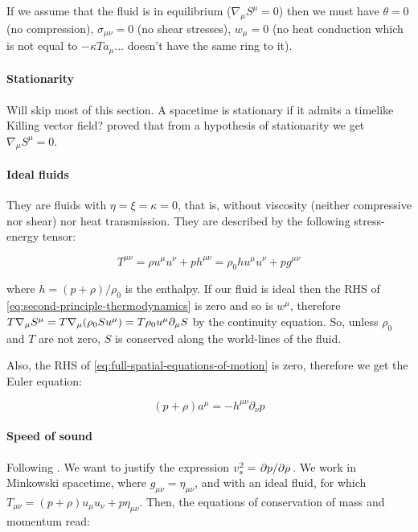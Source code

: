 \documentclass[main.tex]{subfiles}
\begin{document}
If we assume that the fluid is in equilibrium (\(\nabla_\mu S^\mu = 0\)) then we must have \(\theta = 0\) (no compression), \(\sigma_{\mu\nu} = 0 \) (no shear stresses), \(w_\mu=0\) (no heat conduction which is not equal to \(-\kappa T a_\mu\)... doesn't have the same ring to it).

\paragraph{Stationarity}

Will skip most of this section. A spacetime is stationary if it admits a timelike Killing vector field? \textcite[]{Ehlers:1971} proved that from a hypothesis of stationarity we get \(\nabla_\mu S^\mu = 0\).

\paragraph{Ideal fluids}

They are fluids with \(\eta=\xi=\kappa=0\), that is, without viscosity (neither compressive nor shear) nor heat transmission.
They are described by the following stress-energy tensor:

\begin{equation}
    T^{\mu\nu} = \rho u^\mu u^\nu + p h^{\mu\nu} = \rho_0 h u^{\mu} u^\nu + p g^{\mu\nu}
\end{equation}

where \(h = (p + \rho) / \rho_0\) is the enthalpy. If our fluid is ideal then the RHS of \eqref{eq:second-principle-thermodynamics} is zero and so is \(w^\mu\),
therefore \(T \nabla_\mu S^\mu = T \nabla_\mu \qty(\rho_0 S u^\mu) = T \rho_0 u^\mu \partial_\mu S\) by the continuity equation. So, unless \(\rho_0\) and \(T\) are not zero, \(S\) is conserved along the world-lines of the fluid.

Also, the RHS of \eqref{eq:full-spatial-equations-of-motion} is zero, therefore we get the Euler equation:

\begin{equation} \label{eq:relativistic-euler}
    (p+\rho) a^\mu = - h^{\mu \nu} \partial_\nu p
\end{equation}

\paragraph{Speed of sound}

Following \cite[]{Yoshida:2011}.
We want to justify the expression \(v_s^2 = \pdv*{p}{\rho} \). We work in Minkowski spacetime, where \(g_{\mu\nu} = \eta_{\mu\nu}\), and with an ideal fluid, for which \(T_{\mu\nu} = (p+ \rho) u_\mu u_\nu + p \eta_{\mu\nu}\). Then, the equations of conservation of mass and momentum read:
\end{document}

